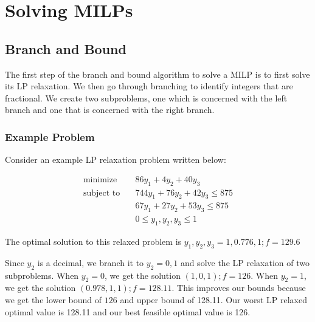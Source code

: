 \section{Solving MILPs}
\subsection{Branch and Bound}
The first step of the branch and bound algorithm to solve a MILP is to first solve its LP relaxation.
We then go through branching to identify integers that are fractional.
We create two subproblems, one which is concerned with the left branch and one that is concerned with the right branch.

\subsubsection{Example Problem}
Consider an example LP relaxation problem written below:

\begin{align}
  \text{minimize} & \quad  86y_1 + 4y_2 + 40y_3\\
  \text{subject to} & \quad 744 y_1 + 76y_2 + 42y_3 \leq 875 \\
  & \quad 67y_1 + 27y_2 + 53y_3 \leq 875 \\
  & \quad 0 \leq y_1, y_2, y_3 \leq 1
\end{align}

The optimal solution to this relaxed problem is 
$y_1, y_2,y_3 = 1, 0.776, 1; f = 129.6$

Since $y_2$ is a decimal, we branch it to $y_2 = 0,1$ and solve the LP relaxation of two subproblems.
When $y_2 = 0$, we get the solution $(1,0,1); f = 126$. 
When $y_2=1$, we get the solution $(0.978,1,1); f = 128.11$.
This improves our bounds because we get the lower bound of $126$ and upper bound of 128.11.
Our worst LP relaxed optimal value is 128.11 and our best feasible optimal value is 126.
